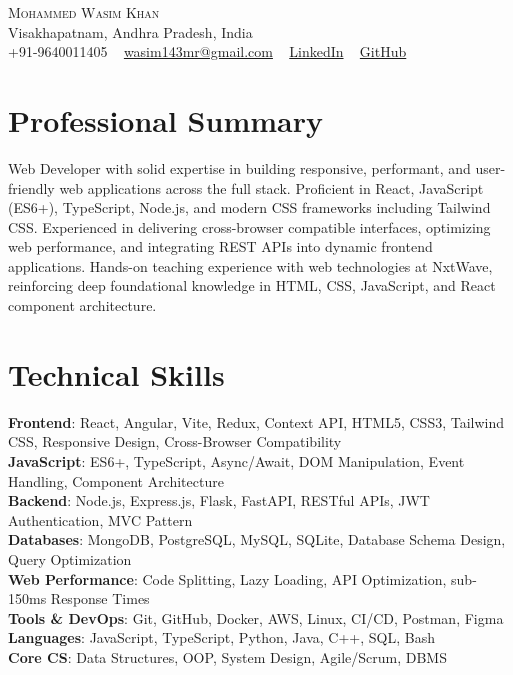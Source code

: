 \documentclass[letterpaper,11pt]{article}
\begin{document}
\begin{center}
  {\Huge \scshape Mohammed Wasim Khan} \\ \vspace{1pt}
  Visakhapatnam, Andhra Pradesh, India \\ \vspace{1pt}
  \small +91-9640011405 ~
  \href{mailto:wasim143mr@gmail.com}{wasim143mr@gmail.com} ~
  \href{https://linkedin.com/in/mohammed-wasim-khan-757595245}{LinkedIn} ~
  \href{https://github.com/wasim-builds}{GitHub}
  \vspace{-8pt}
\end{center}

\section{Professional Summary}
Web Developer with solid expertise in building responsive, performant, and user-friendly web applications across the full stack. Proficient in React, JavaScript (ES6+), TypeScript, Node.js, and modern CSS frameworks including Tailwind CSS. Experienced in delivering cross-browser compatible interfaces, optimizing web performance, and integrating REST APIs into dynamic frontend applications. Hands-on teaching experience with web technologies at NxtWave, reinforcing deep foundational knowledge in HTML, CSS, JavaScript, and React component architecture.

\section{Technical Skills}
\begin{itemize}[leftmargin=0.15in, label={}]
  \small{\item{
    \textbf{Frontend}{: React, Angular, Vite, Redux, Context API, HTML5, CSS3, Tailwind CSS, Responsive Design, Cross-Browser Compatibility} \\
    \textbf{JavaScript}{: ES6+, TypeScript, Async/Await, DOM Manipulation, Event Handling, Component Architecture} \\
    \textbf{Backend}{: Node.js, Express.js, Flask, FastAPI, RESTful APIs, JWT Authentication, MVC Pattern} \\
    \textbf{Databases}{: MongoDB, PostgreSQL, MySQL, SQLite, Database Schema Design, Query Optimization} \\
    \textbf{Web Performance}{: Code Splitting, Lazy Loading, API Optimization, sub-150ms Response Times} \\
    \textbf{Tools \& DevOps}{: Git, GitHub, Docker, AWS, Linux, CI/CD, Postman, Figma} \\
    \textbf{Languages}{: JavaScript, TypeScript, Python, Java, C++, SQL, Bash} \\
    \textbf{Core CS}{: Data Structures, OOP, System Design, Agile/Scrum, DBMS}
  }}
\end{itemize}
\vspace{-16pt}
\end{document}

